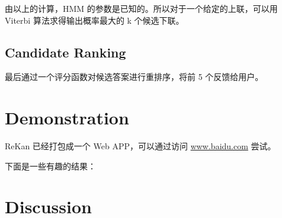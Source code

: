 \documentclass[12pt]{article}
\begin{document}
由以上的计算，HMM 的参数是已知的。所以对于一个给定的上联，可以用 Viterbi 算法求得输出概率最大的 k 个候选下联。

\subsection{Candidate Ranking}

最后通过一个评分函数对候选答案进行重排序，将前 5 个反馈给用户。

\newpage

\section{Demonstration}

ReKan 已经打包成一个 Web APP，可以通过访问 \url{www.baidu.com} 尝试。

下面是一些有趣的结果：


\newpage

\section{Discussion}
\end{document}
